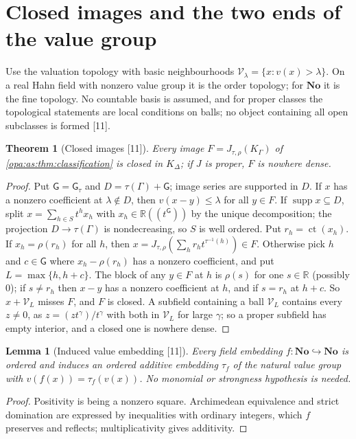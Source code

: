 \documentclass[11pt,oneside]{article}
\numberwithin{equation}{section}
\newtheorem{theorem}{Theorem}[section]
\newtheorem{lemma}[lemma]{Lemma}
\theoremstyle{definition}
\theoremstyle{remark}
\newcommand{\No}{\mathbf{No}}
\newcommand{\R}{\mathbb R}
\newcommand{\supp}{\operatorname{supp}}
\newcommand{\ct}{\operatorname{ct}}
\newcommand{\Hahn}[2]{#1((t^{#2}))}
\newcommand{\src}[1]{\textup{\textsf{\small[#1]}}}
\newcommand{\gap}{\mathsf G}
\begin{document}
\section{Closed images and the two ends of the value group}\label{opa:as:sec:topology}

Use the valuation topology with basic neighbourhoods $\mathcal V_\lambda=\{x:v(x)>\lambda\}$. On a real Hahn
field with nonzero value group it is the order topology; for $\No$ it is the fine topology. No countable
basis is assumed, and for proper classes the topological statements are local conditions on balls; no
object containing all open subclasses is formed \src{11}.

\begin{theorem}[Closed images \src{11}]\label{opa:as:thm:closed}
Every image $F=J_{\tau,\rho}(K_\Gamma)$ of \cref{opa:as:thm:classification} is closed in $K_\Delta$; if $J$ is
proper, $F$ is nowhere dense.
\end{theorem}
\begin{proof}
Put $\mathsf G=\gap_\tau$ and $D=\tau(\Gamma)+\mathsf G$; image series are supported in $D$. If $x$ has a
nonzero coefficient at $\lambda\notin D$, then $v(x-y)\le\lambda$ for all $y\in F$. If $\supp x\subseteq D$, split
$x=\sum_{h\in S}t^hx_h$ with $x_h\in\Hahn\R{\mathsf G}$ by the unique decomposition; the projection
$D\to\tau(\Gamma)$ is nondecreasing, so $S$ is well ordered. Put $r_h=\ct(x_h)$. If $x_h=\rho(r_h)$ for all
$h$, then $x=J_{\tau,\rho}(\sum_hr_ht^{\tau^{-1}(h)})\in F$. Otherwise pick $h$ and $c\in\mathsf G$ where
$x_h-\rho(r_h)$ has a nonzero coefficient, and put $L=\max\{h,h+c\}$. The block of any $y\in F$ at $h$ is
$\rho(s)$ for one $s\in\R$ (possibly $0$); if $s\ne r_h$ then $x-y$ has a nonzero coefficient at $h$, and if
$s=r_h$ at $h+c$. So $x+\mathcal V_L$ misses $F$, and $F$ is closed. A subfield containing a ball $\mathcal V_L$
contains every $z\ne0$, as $z=(zt^\gamma)/t^\gamma$ with both in $\mathcal V_L$ for large $\gamma$; so a proper
subfield has empty interior, and a closed one is nowhere dense.
\end{proof}

\begin{lemma}[Induced value embedding \src{11}]\label{opa:as:lem:natural}
Every field embedding $f:\No\hookrightarrow\No$ is ordered and induces an ordered additive embedding
$\tau_f$ of the natural value group with $v(f(x))=\tau_f(v(x))$. No monomial or strongness hypothesis is
needed.
\end{lemma}
\begin{proof}
Positivity is being a nonzero square. Archimedean equivalence and strict domination are expressed by
inequalities with ordinary integers, which $f$ preserves and reflects; multiplicativity gives additivity.
\end{proof}
\end{document}
